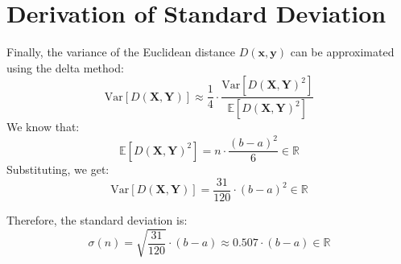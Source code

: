 \documentclass{article}
\begin{document}
\section{Derivation of Standard Deviation}
Finally, the variance of the Euclidean distance $D(\mathbf{x}, \mathbf{y})$ can be approximated using the delta method:
\begin{equation}
    \text{Var}[D(\mathbf{X}, \mathbf{Y})] \approx \frac{1}{4} \cdot \frac{\text{Var}[D(\mathbf{X}, \mathbf{Y})^2]}{\mathbb{E}[D(\mathbf{X}, \mathbf{Y})^2]}
\end{equation}
We know that:
\begin{equation}
    \mathbb{E}[D(\mathbf{X}, \mathbf{Y})^2] = n \cdot \frac{(b - a)^2}{6} \in \mathbb{R}
\end{equation}
Substituting, we get:
\begin{equation}
    \text{Var}[D(\mathbf{X}, \mathbf{Y})] = \frac{31}{120} \cdot (b - a)^2 \in \mathbb{R}
\end{equation}

Therefore, the standard deviation is:
\begin{equation}
    \sigma(n) = \sqrt{\frac{31}{120}} \cdot (b - a) \approx 0.507 \cdot (b - a) \in \mathbb{R}
\end{equation}
\end{document}
